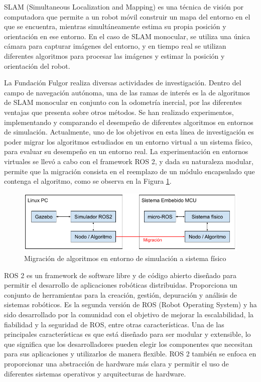 \documentclass[
11pt, %
codirector, %
]{charter}
\begin{document}
SLAM (Simultaneous Localization and Mapping) es una técnica de visión por computadora que permite a un robot móvil construir un mapa del entorno en el que se encuentra, mientras simultáneamente estima su propia posición y orientación en ese entorno. En el caso de SLAM monocular, se utiliza una única cámara para capturar imágenes del entorno, y en tiempo real se utilizan diferentes algoritmos para procesar las imágenes y estimar la posición y orientación del robot.

La Fundación Fulgor realiza diversas actividades de investigación. Dentro del campo de navegación autónoma, una de las ramas de interés es la de algoritmos de SLAM monocular en conjunto con la odometría inercial, por las diferentes ventajas que presenta sobre otros métodos. Se han realizado experimentos, implementando y comparando el desempeño de diferentes algoritmos en entornos de simulación. Actualmente, uno de los objetivos en esta línea de investigación es poder migrar los algoritmos estudiados en un entorno virtual a un sistema físico, para evaluar su desempeño en un entorno real. La experimentación en entornos virtuales se llevó a cabo con el framework ROS 2, y dada su naturaleza modular, permite que la migración consista en el reemplazo de un módulo encapsulado que contenga el algoritmo, como se observa en la Figura \ref{fig:ros2-to-microros}. 

\begin{figure}[htpb]
\centering 
\includegraphics[width=.8\textwidth]{./Figuras/ros2-microros-migration.png}
\caption{Migración de algoritmos en entorno de simulación a sistema físico}
\label{fig:ros2-to-microros}
\end{figure}


ROS 2 es un framework de software libre y de código abierto diseñado para permitir el desarrollo de aplicaciones robóticas distribuidas. Proporciona un conjunto de herramientas para la creación, gestión, depuración y análisis de sistemas robóticos. Es la segunda versión de ROS (Robot Operating System) y ha sido desarrollado por la comunidad con el objetivo de mejorar la escalabilidad, la fiabilidad y la seguridad de ROS, entre otras características. Una de las principales características es que está diseñado para ser modular y extensible, lo que significa que los desarrolladores pueden elegir los componentes que necesitan para sus aplicaciones y utilizarlos de manera flexible. ROS 2 también se enfoca en proporcionar una abstracción de hardware más clara y permitir el uso de diferentes sistemas operativos y arquitecturas de hardware. 
\end{document}
